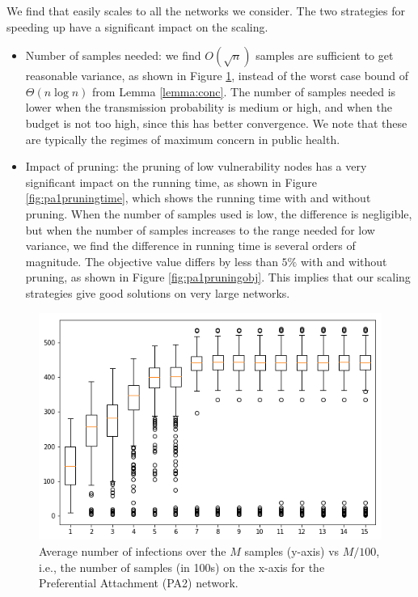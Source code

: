 We find that \algo{} easily scales to all the networks we consider. The two strategies for speeding up have a
significant impact on the scaling.
\begin{itemize}
\item
Number of samples needed: we find $O(\sqrt{n})$ samples are sufficient to get reasonable variance, as shown in Figure \ref{fig:pa_boxplot},
instead of the worst case bound of $\Theta(n\log{n})$ from Lemma \ref{lemma:conc}.
The number of samples needed is lower when the transmission probability is medium or high, and when the budget is not too high,
since this has better convergence. We note that these are typically the regimes of maximum concern in public health.
\item
Impact of pruning: the pruning of low vulnerability nodes has a very significant impact on the running time,
as shown in Figure \ref{fig:pa1pruningtime}, which shows the running time with and without pruning. 
When the number of samples used is low, the difference is negligible, but when the number of samples increases to
the range needed for low variance, we find the difference in running time is several orders of magnitude.
The objective value differs by less than $5\%$ with and without pruning, as shown in Figure \ref{fig:pa1pruningobj}.
This implies that our scaling strategies give good solutions on very large networks.
\end{itemize}
 
\begin{figure}[!h]
    \centering
    \includegraphics[scale = 0.4]{Figuresnew/boxplotpa.png}
    \caption{Average number of infections over the $M$ samples (y-axis) vs $M/100$, i.e., the number of samples (in 100s) on the x-axis
for the Preferential Attachment (PA2) network.
}
    \label{fig:pa_boxplot}
\end{figure}



